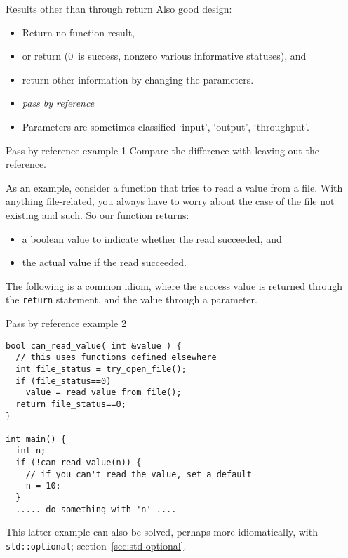 \begin{slide}{Results other than through return}
  \label{sl:func-err-return}
  Also good design:
  \begin{itemize}
  \item Return no function result,
  \item or return  (0~is success, nonzero various
    informative statuses), and
  \item return other information by changing the parameters.
  \item \emph{pass by reference}
  \item Parameters are sometimes classified `input', `output', `throughput'.
  \end{itemize}
\end{slide}

\begin{block}{Pass by reference example 1}
  \label{sl:pass-reference1}
  Compare the difference with leaving out the reference.
\end{block}

As an example, consider a function that tries to read a value from a
file. With anything file-related, you always have to worry about the
case of the file not existing and such. So our function returns:
\begin{itemize}
\item a boolean value to indicate whether the read succeeded, and
\item the actual value if the read succeeded.
\end{itemize}
The following is a common idiom, where the success value is returned
through the \lstinline{return} statement, and the value through a parameter.

\begin{block}{Pass by reference example 2}
  \label{sl:pass-reference2}
\footnotesize
\begin{lstlisting}
bool can_read_value( int &value ) {
  // this uses functions defined elsewhere
  int file_status = try_open_file();
  if (file_status==0) 
    value = read_value_from_file();
  return file_status==0;
}

int main() {
  int n;
  if (!can_read_value(n)) {
    // if you can't read the value, set a default
    n = 10;
  }
  ..... do something with 'n' ....
\end{lstlisting}
\end{block}

This latter example can also be solved,
perhaps more idiomatically, with \lstinline+std::optional+;
section~\ref{sec:std-optional}.

